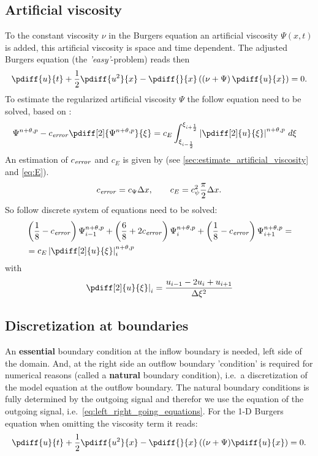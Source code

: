 \subsection{Artificial viscosity}
To the constant viscosity $\nu$ in the Burgers equation an artificial viscosity $\Psi(x,t)$ is added, this artificial viscosity is space and time dependent.
The adjusted Burgers equation (the \textit{'easy'}-problem) reads then
\begin{align}
    \pdiff{u}{t} + \half \pdiff{u^2}{x} - \pdiff{}{x} \left( \left(\nu + \Psi \right) \pdiff{u}{x} \right) = 0. \label{eq:1d_burgers_easy}
\end{align}
%
To estimate the regularized artificial viscosity $\Psi$ the follow equation need to be solved, based on \citet[eq.\ 18]{Borsboom2001}:
\begin{align}
    &\Psi^{n+\theta,p} - c_{\it error}\pdiff[2]{\Psi^{n+\theta,p}}{\xi} = c_E \int^{\xi_{i+\half}}_{\xi_{i-\half}} \abs{\pdiff[2]{u}{\xi}}^{n+\theta,p} \, d\xi
\end{align}
An estimation of $c_{\it error}$ and $c_E$ is given by (see \autoref{sec:estimate_artificial_viscosity} and
\autoref{eq:E}).
\begin{align}
    c_{\it error} = c_\Psi \Delta x, \qquad c_E = c_\psi^2 \frac{\pi}{2} \Delta x.
\end{align}
%
So follow discrete system of equations need to be solved:
\begin{align}
    &\left(\frac{1}{8} -  c_{\it error}\right) \Psi^{n+\theta,p}_{i-1} +
    \left(\frac{6}{8} + 2 c_{\it error}\right) \Psi^{n+\theta,p}_i +
    \left(\frac{1}{8} -   c_{\it error}\right) \Psi^{n+\theta,p}_{i+1} =
    \\*
    & = c_E \abs{\pdiff[2]{u}{\xi}}^{n+\theta,p}_{i}
\end{align}
with
\begin{align}
    \left.\pdiff[2]{u}{\xi}\right|_i = \frac{u_{i-1} - 2 u_i + u_{i+1} }{\Dxi^2}
\end{align}
\subsection{Discretization at boundaries}
An \textbf{essential} boundary condition at the inflow boundary is needed, left side of the domain.
And, at the right side an outflow boundary 'condition' is required for numerical reasons (called  a \textbf{natural} boundary condition), i.e.\ a discretization of the model equation at the outflow boundary.
The natural boundary conditions is fully determined by the outgoing signal and therefor we use the equation of the outgoing signal, i.e.\ \autoref{eq:left_right_going_equations}.
For the 1-D Burgers equation when omitting the viscosity term it reads:
\begin{align}
    \pdiff{u}{t} + \half\pdiff{u^2}{x} - \pdiff{}{x} \left( (\nu + \Psi)  \pdiff{u}{x} \right) = 0. \label{eq:1d_burgers_a}
\end{align}
